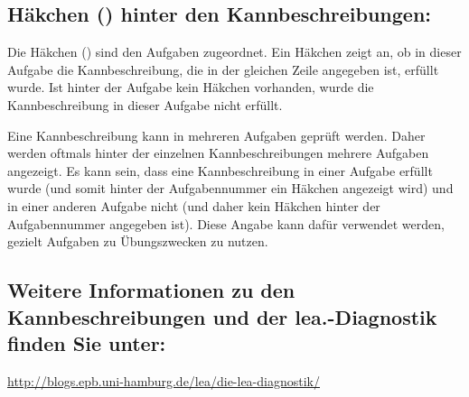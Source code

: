 \documentclass{article}
\begin{document}

\subsection*{Häkchen (\checkmark) hinter den Kannbeschreibungen:}
Die Häkchen (\checkmark) sind den Aufgaben zugeordnet. Ein Häkchen zeigt an, ob in dieser Aufgabe die Kannbeschreibung, die in der gleichen Zeile angegeben ist, erfüllt wurde. Ist hinter der Aufgabe kein Häkchen vorhanden, wurde die Kannbeschreibung in dieser Aufgabe nicht erfüllt.

\noindent Eine Kannbeschreibung kann in mehreren Aufgaben geprüft werden. Daher werden oftmals hinter der einzelnen Kannbeschreibungen mehrere Aufgaben angezeigt. Es kann sein, dass eine Kannbeschreibung in einer Aufgabe erfüllt wurde (und somit hinter der Aufgabennummer ein Häkchen angezeigt wird) und in einer anderen Aufgabe nicht (und daher kein Häkchen hinter der Aufgabennummer angegeben ist). Diese Angabe kann dafür verwendet werden, gezielt Aufgaben zu Übungszwecken zu nutzen.
\subsection*{Weitere Informationen zu den Kannbeschreibungen und der lea.-Diagnostik finden Sie unter:}
\begin{center}\url{http://blogs.epb.uni-hamburg.de/lea/die-lea-diagnostik/}\end{center}
\newpage
\restoregeometry


\pagecolor{bg}

\newpage

\newpage

\end{document}
